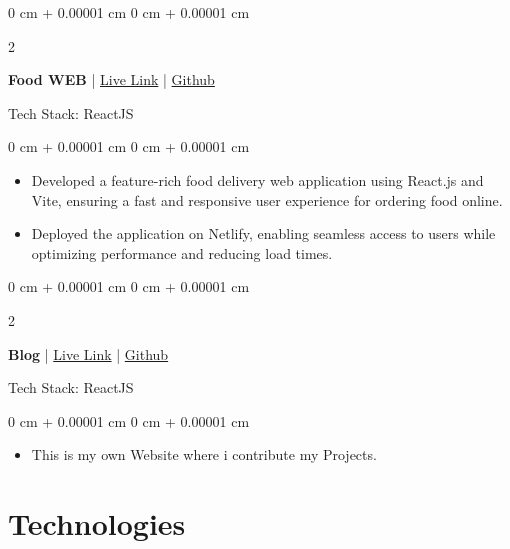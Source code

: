 \documentclass[12pt, a3paper]{article}
\newenvironment{highlights}{
    \begin{itemize}[
        topsep=0.10 cm,
        parsep=0.10 cm,
        partopsep=0pt,
        itemsep=0pt,
        leftmargin=0 cm + 10pt
    ]
}{
    \end{itemize}
} %
\newenvironment{onecolentry}{
    \begin{adjustwidth}{
        0 cm + 0.00001 cm
    }{
        0 cm + 0.00001 cm
    }
}{
    \end{adjustwidth}
} %
\newenvironment{twocolentry}[2][]{
    \onecolentry
    \def\secondColumn{#2}
    \setcolumnwidth{\fill, 4.5 cm}
    \begin{paracol}{2}
}{
    \switchcolumn \raggedleft \secondColumn
    \end{paracol}
    \endonecolentry
} %
\begin{document}
        \vspace{0.7 cm}

        \begin{twocolentry}{
        }
            \textbf{Food WEB } | \href{https://trishafood-delivery-app.netlify.app/}{Live Link} | \href{https://github.com/trishaamandal/fooddelivery}{Github}\end{twocolentry}
            Tech Stack: ReactJS

        \vspace{0.10 cm}
        \begin{onecolentry}
            \begin{highlights}
                \item Developed a feature-rich food delivery web application using React.js and Vite, ensuring a fast and responsive user experience for ordering food online.
                \item Deployed the application on Netlify, enabling seamless access to users while optimizing performance and reducing load times.
            \end{highlights}
        \end{onecolentry}
        \vspace{0.7 cm}
        \begin{twocolentry}{
            }
                \textbf{Blog } | \href{https://trishamandal2004.netlify.app/}{Live Link} | \href{https://github.com/trishaamandal/portfoliomain2025}{Github}\end{twocolentry}
                Tech Stack: ReactJS
    
            \vspace{0.10 cm}
            \begin{onecolentry}
                \begin{highlights}
                    \item This is my own Website where i contribute my Projects.
                    \end{highlights}
            \end{onecolentry}


        \vspace{0.2 cm}

        \vspace{0.7 cm}


    
    \section{Technologies}
\end{document}
